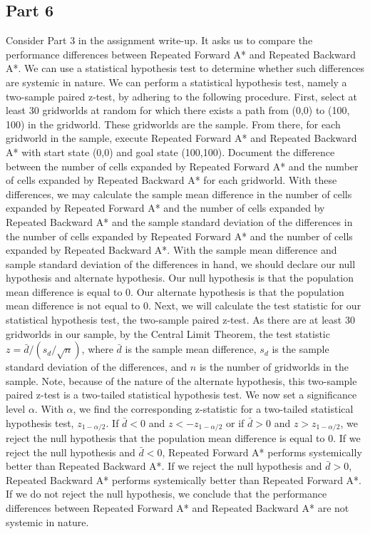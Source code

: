 \documentclass{article}
\begin{document}
\subsection*{Part 6}
Consider Part 3 in the assignment write-up. It asks us to compare the performance differences between Repeated Forward A* and Repeated Backward A*. We can use a statistical hypothesis test to determine whether such differences are systemic in nature. We can perform a statistical hypothesis test, namely a two-sample paired z-test, by adhering to the following procedure. First, select at least 30 gridworlds at random for which there exists a path from (0,0) to (100, 100) in the gridworld. These gridworlds are the sample. From there, for each gridworld in the sample, execute Repeated Forward A* and Repeated Backward A* with start state (0,0) and goal state (100,100). Document the difference between the number of cells expanded by Repeated Forward A* and the number of cells expanded by Repeated Backward A* for each gridworld. With these differences, we may calculate the sample mean difference in the number of cells expanded by Repeated Forward A* and the number of cells expanded by Repeated Backward A* and the sample standard deviation of the differences in the number of cells expanded by Repeated Forward A* and the number of cells expanded by Repeated Backward A*. With the sample mean difference and sample standard deviation of the differences in hand, we should declare our null hypothesis and alternate hypothesis. Our null hypothesis is that the population mean difference is equal to 0. Our alternate hypothesis is that the population mean difference is not equal to 0. Next, we will calculate the test statistic for our statistical hypothesis test, the two-sample paired z-test. As there are at least 30 gridworlds in our sample, by the Central Limit Theorem, the test statistic $z = \bar{d}/(s_{d}/\sqrt{n})$, where $\bar{d}$ is the sample mean difference, $s_{d}$ is the sample standard deviation of the differences, and $n$ is the number of gridworlds in the sample. Note, because of the nature of the alternate hypothesis, this two-sample paired z-test is a two-tailed statistical hypothesis test. We now set a significance level $\alpha$. With $\alpha$, we find the corresponding z-statistic for a two-tailed statistical hypothesis test, $z_{1-\alpha/2}$. If $\bar{d}<0$ and $z<-z_{1-\alpha/2}$ or if $\bar{d}>0$ and $z>z_{1-\alpha/2}$, we reject the null hypothesis that the population mean difference is equal to 0. If we reject the null hypothesis and $\bar{d}<0$, Repeated Forward A* performs systemically better than Repeated Backward A*. If we reject the null hypothesis and $\bar{d}>0$, Repeated Backward A* performs systemically better than Repeated Forward A*. If we do not reject the null hypothesis, we conclude that the performance differences between Repeated Forward A* and Repeated Backward A* are not systemic in nature.           
\end{document}
